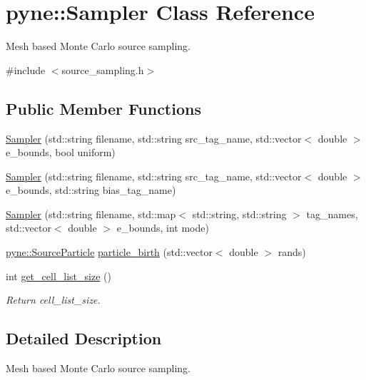 \hypertarget{classpyne_1_1_sampler}{}\section{pyne\+:\+:Sampler Class Reference}
\label{classpyne_1_1_sampler}


Mesh based Monte Carlo source sampling.  




{\ttfamily \#include $<$source\+\_\+sampling.\+h$>$}

\subsection*{Public Member Functions}
\begin{DoxyCompactItemize}
\item 
\hyperlink{classpyne_1_1_sampler_a57e096205922e6a221f2185a9849c5ed}{Sampler} (std\+::string filename, std\+::string src\+\_\+tag\+\_\+name, std\+::vector$<$ double $>$ e\+\_\+bounds, bool uniform)
\item 
\hyperlink{classpyne_1_1_sampler_a058411845da467ff7421956ba076ac31}{Sampler} (std\+::string filename, std\+::string src\+\_\+tag\+\_\+name, std\+::vector$<$ double $>$ e\+\_\+bounds, std\+::string bias\+\_\+tag\+\_\+name)
\item 
\hyperlink{classpyne_1_1_sampler_aa4b5811e49b8ac278e2e936d29500eb5}{Sampler} (std\+::string filename, std\+::map$<$ std\+::string, std\+::string $>$ tag\+\_\+names, std\+::vector$<$ double $>$ e\+\_\+bounds, int mode)
\item 
\hyperlink{classpyne_1_1_source_particle}{pyne\+::\+Source\+Particle} \hyperlink{classpyne_1_1_sampler_a2e5d98ef0f98a3093c32936ce6cc8cd2}{particle\+\_\+birth} (std\+::vector$<$ double $>$ rands)
\item 
\mbox{\label{classpyne_1_1_sampler_afe9890aa67022274a66489669195603a}} 
int \hyperlink{classpyne_1_1_sampler_afe9890aa67022274a66489669195603a}{get\+\_\+cell\+\_\+list\+\_\+size} ()
\begin{DoxyCompactList}\small\item\em Return cell\+\_\+list\+\_\+size. \end{DoxyCompactList}\end{DoxyCompactItemize}


\subsection{Detailed Description}
Mesh based Monte Carlo source sampling. 

